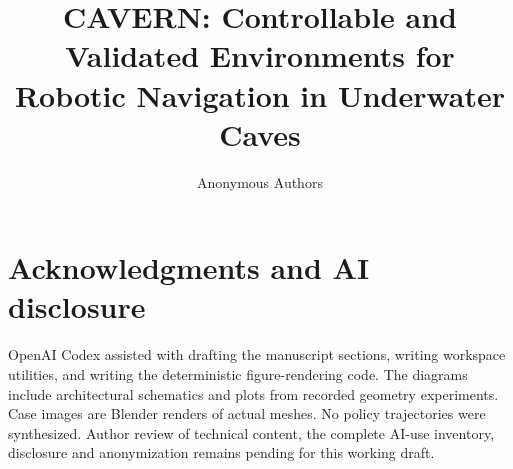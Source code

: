 \documentclass[letterpaper,10pt,conference]{ieeeconf}
\title{\LARGE\bf CAVERN: Controllable and Validated Environments for Robotic Navigation in Underwater Caves}
\author{Anonymous Authors}
\begin{document}
\maketitle
\thispagestyle{empty}\pagestyle{empty}
\begin{abstract}

\end{abstract}






\section*{Acknowledgments and AI disclosure}
OpenAI Codex assisted with drafting the manuscript sections, writing workspace
utilities, and writing the deterministic figure-rendering code. The diagrams
include architectural schematics and plots from recorded geometry experiments.
Case images are Blender renders of actual meshes. No policy trajectories were
synthesized. Author review of technical content, the complete AI-use inventory,
disclosure and anonymization remains pending for this working draft.


\end{document}
